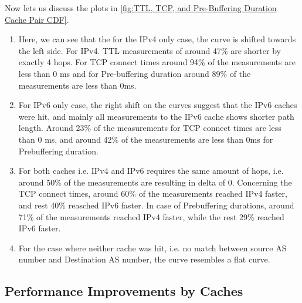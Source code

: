 Now lets us discuss the plots in \cref{fig:TTL, TCP, and Pre-Buffering Duration Cache Pair CDF}. 

\begin{enumerate}
	\item Here, we can see that the for the IPv4 only case, the curve is shifted towards the left side. For IPv4. TTL measurements of around 47\% are shorter by exactly 4 hops. 
	For TCP connect times around 94\% of the measurements are less than 0 ms and for Pre-buffering duration around 89\% of the measurements are less than 0ms.
	\item For IPv6 only case, the right shift on the curves suggest that the IPv6 caches were hit, and mainly all measurements to the IPv6 cache shows shorter path length. Around 23\% of the measurements for TCP connect times are less than 0 ms,
    and around 42\% of the measurements are less than 0ms for Prebuffering duration.
	\item For both caches i.e. IPv4 and IPv6 requires the same amount of hops, i.e. around 50\% of the measurements are resulting in delta of 0. Concerning the TCP connect times,
    around 60\% of the measurements reached IPv4 faster, and rest 40\% reasched IPv6 faster. In case of Prebuffering durations, around 71\% of the measurements reached IPv4 faster, while the rest 29\% reached IPv6 faster.
    \item For the case where neither cache was hit, i.e. no match between source AS number and Destination AS number, the curve resembles a flat curve.
\end{enumerate}
 
\subsection*{Performance Improvements by Caches}

